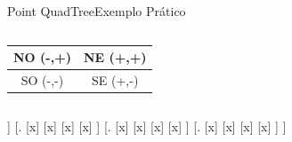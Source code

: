 \documentclass[red, tikz, aspectratio=169, xcolor=dvipsnames]{beamer}
\begin{document}
 


			\begin{frame}[fragile]{Point QuadTree}{Exemplo Prático}
				\centering
				\vspace{-40px}
				\begin{columns}
					\begin{column}{0.48\textwidth}
						\centering
						\begin{tabular}{|c|c|}
							\hline 
							NO (-,+) & NE (+,+) \\ 
							\hline 
							SO (-,-) & SE (+,-) \\ 
							\hline 
						\end{tabular} 
					\end{column}
					\begin{column}{0.5\textwidth}
						\centering
						\fbox{
							\begin{forest}
								[\texttt{(x,y)}
								[NO]
								[NE]
								[SO]
								[SE]
								]
						\end{forest}}
					\end{column}
				\end{columns}
				\vspace{10px}
				
				\vspace{10px}
				
				\begin{minipage}{\textwidth}
					\centering
					
					\begin{forest}
						[\texttt{(35,40)}
						[.
						[x]
						[x]
						[x]
						[x]
						]
						[.
						[x]
						[x]
						[x]
						[x]
						]
						[.
						[x]
						[x]
						[x]
						[x]
						]
						[.
						[x]
						[x]
						[x]
						[x]
						]
						]
					\end{forest}
				\end{minipage}
			\end{frame}
			
\end{document}

